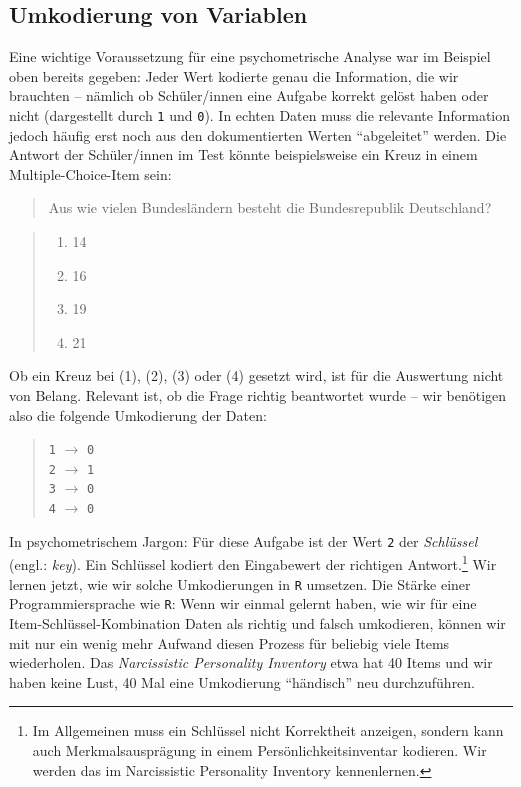 \documentclass[12pt,]{tufte-book}
\providecommand{\tightlist}{%
  \setlength{\itemsep}{0pt}\setlength{\parskip}{0pt}}
\theoremstyle{definition}
\theoremstyle{definition}
\theoremstyle{definition}
\theoremstyle{remark}
\begin{document}
\subsection{Umkodierung von Variablen}\label{umkodierung-von-variablen}

Eine wichtige Voraussetzung für eine psychometrische Analyse war im
Beispiel oben bereits gegeben: Jeder Wert kodierte genau die
Information, die wir brauchten -- nämlich ob Schüler/innen eine Aufgabe
korrekt gelöst haben oder nicht (dargestellt durch \texttt{1} und
\texttt{0}). In echten Daten muss die relevante Information jedoch
häufig erst noch aus den dokumentierten Werten ``abgeleitet'' werden.
Die Antwort der Schüler/innen im Test könnte beispielsweise ein Kreuz in
einem Multiple-Choice-Item sein:

\begin{quote}
Aus wie vielen Bundesländern besteht die Bundesrepublik Deutschland?
\end{quote}

\begin{quote}
\begin{enumerate}
\def\labelenumi{(\arabic{enumi})}
\tightlist
\item
  14\\
\item
  16\\
\item
  19\\
\item
  21
\end{enumerate}
\end{quote}

Ob ein Kreuz bei (1), (2), (3) oder (4) gesetzt wird, ist für die
Auswertung nicht von Belang. Relevant ist, ob die Frage richtig
beantwortet wurde -- wir benötigen also die folgende Umkodierung der
Daten:

\begin{quote}
\texttt{1} \(\to\) \texttt{0}\\
\texttt{2} \(\to\) \texttt{1}\\
\texttt{3} \(\to\) \texttt{0}\\
\texttt{4} \(\to\) \texttt{0}
\end{quote}

In psychometrischem Jargon: Für diese Aufgabe ist der Wert \texttt{2}
der \emph{Schlüssel} (engl.: \emph{key}). Ein Schlüssel kodiert den
Eingabewert der richtigen Antwort.\footnote{Im Allgemeinen muss ein
  Schlüssel nicht Korrektheit anzeigen, sondern kann auch
  Merkmalsausprägung in einem Persönlichkeitsinventar kodieren. Wir
  werden das im Narcissistic Personality Inventory kennenlernen.} Wir
lernen jetzt, wie wir solche Umkodierungen in \texttt{R} umsetzen. Die
Stärke einer Programmiersprache wie \texttt{R}: Wenn wir einmal gelernt
haben, wie wir für eine Item-Schlüssel-Kombination Daten als richtig und
falsch umkodieren, können wir mit nur ein wenig mehr Aufwand diesen
Prozess für beliebig viele Items wiederholen. Das \emph{Narcissistic
Personality Inventory} etwa hat 40 Items und wir haben keine Lust, 40
Mal eine Umkodierung ``händisch'' neu durchzuführen.
\end{document}
